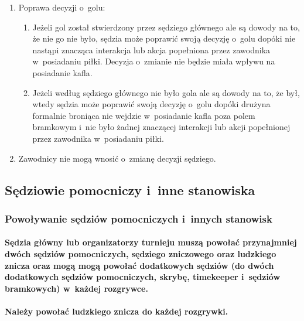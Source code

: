 \documentclass[12pt]{article}
\begin{document}
\begin{enumerate}
	\item
	      Poprawa decyzji o~golu:

	      \begin{enumerate}
		      \item
		            Jeżeli gol został stwierdzony przez sędziego głównego ale są dowody
		            na to, że nie go nie było, sędzia może poprawić swoją decyzję o~golu
		            dopóki nie nastąpi znacząca interakcja lub akcja popełniona przez
		            zawodnika w~posiadaniu piłki. Decyzja o~zmianie nie będzie miała
		            wpływu na posiadanie kafla.
		      \item
		            Jeżeli według sędziego głównego nie było gola ale są dowody na to,
		            że był, wtedy sędzia może poprawić swoją decyzję o~golu dopóki
		            drużyna formalnie broniąca nie wejdzie w~posiadanie kafla poza polem
		            bramkowym i~nie było żadnej znaczącej interakcji lub akcji
		            popełnionej przez zawodnika w~posiadaniu piłki.
	      \end{enumerate}
	\item
	      Zawodnicy nie mogą wnosić o~zmianę decyzji sędziego.
\end{enumerate}

\subsection{Sędziowie pomocniczy i~inne stanowiska}

\subsubsection{Powoływanie sędziów pomocniczych i~innych stanowisk}

\paragraph{Sędzia główny lub organizatorzy turnieju muszą powołać
	przynajmniej dwóch sędziów pomocniczych, sędziego zniczowego oraz
	ludzkiego znicza oraz mogą mogą powołać dodatkowych sędziów (do dwóch
	dodatkowych sędziów pomocniczych, skrybę, timekeeper i~sędziów
	bramkowych) w~każdej rozgrywce.}

\paragraph{Należy powołać ludzkiego znicza do każdej rozgrywki.}
\end{document}
